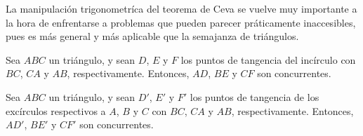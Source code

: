 La manipulación trigonometríca del teorema de Ceva se vuelve muy importante a la hora de enfrentarse a problemas que pueden parecer práticamente inaccesibles, pues es más general y más aplicable que la semajanza de triángulos.

\begin{section-definition}
    Sea $ABC$ un triángulo, y sean $D$, $E$ y $F$ los puntos de tangencia del incírculo con $BC$, $CA$ y $AB$, respectivamente.
    Entonces, $AD$, $BE$ y $CF$ son concurrentes.
\end{section-definition}

\begin{section-definition}
    Sea $ABC$ un triángulo, y sean $D'$, $E'$ y $F'$ los puntos de tangencia de los excírculos respectivos a $A$, $B$ y $C$ con $BC$, $CA$ y $AB$, respectivamente.
    Entonces, $AD'$, $BE'$ y $CF'$ son concurrentes.
\end{section-definition}


